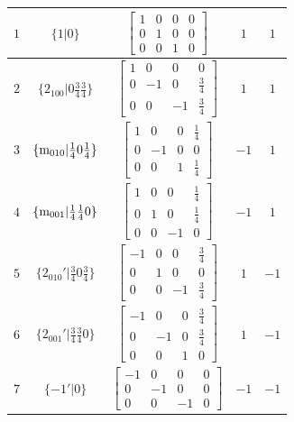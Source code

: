 \documentclass[fleqn,8pt]{jsarticle}
\begin{document}
\begin{longtable}{ccccc}
$ 1 $ & $ \{1|0\} $ & $ \begin{bmatrix} 1 & 0 & 0 & 0 \\ 0 & 1 & 0 & 0 \\ 0 & 0 & 1 & 0 \end{bmatrix} $ & $ 1 $ & $ 1 $ \\ \hline
$ 2 $ & $ \{2{}_{100}|0 \frac{3}{4} \frac{3}{4}\} $ & $ \begin{bmatrix} 1 & 0 & 0 & 0 \\ 0 & -1 & 0 & \frac{3}{4} \\ 0 & 0 & -1 & \frac{3}{4} \end{bmatrix} $ & $ 1 $ & $ 1 $ \\ \hline
$ 3 $ & $ \{{\rm m}_{010}|\frac{1}{4} 0 \frac{1}{4}\} $ & $ \begin{bmatrix} 1 & 0 & 0 & \frac{1}{4} \\ 0 & -1 & 0 & 0 \\ 0 & 0 & 1 & \frac{1}{4} \end{bmatrix} $ & $ -1 $ & $ 1 $ \\ \hline
$ 4 $ & $ \{{\rm m}_{001}|\frac{1}{4} \frac{1}{4} 0\} $ & $ \begin{bmatrix} 1 & 0 & 0 & \frac{1}{4} \\ 0 & 1 & 0 & \frac{1}{4} \\ 0 & 0 & -1 & 0 \end{bmatrix} $ & $ -1 $ & $ 1 $ \\ \hline
$ 5 $ & $ \{2{}_{010}{}'|\frac{3}{4} 0 \frac{3}{4}\} $ & $ \begin{bmatrix} -1 & 0 & 0 & \frac{3}{4} \\ 0 & 1 & 0 & 0 \\ 0 & 0 & -1 & \frac{3}{4} \end{bmatrix} $ & $ 1 $ & $ -1 $ \\ \hline
$ 6 $ & $ \{2{}_{001}{}'|\frac{3}{4} \frac{3}{4} 0\} $ & $ \begin{bmatrix} -1 & 0 & 0 & \frac{3}{4} \\ 0 & -1 & 0 & \frac{3}{4} \\ 0 & 0 & 1 & 0 \end{bmatrix} $ & $ 1 $ & $ -1 $ \\ \hline
$ 7 $ & $ \{-1{}'|0\} $ & $ \begin{bmatrix} -1 & 0 & 0 & 0 \\ 0 & -1 & 0 & 0 \\ 0 & 0 & -1 & 0 \end{bmatrix} $ & $ -1 $ & $ -1 $ \\ \hline

\end{longtable}
\end{document}
